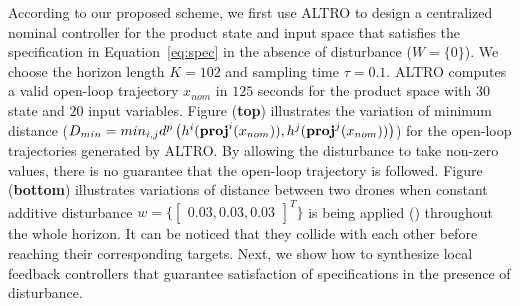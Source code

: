 According to our proposed scheme, we first use ALTRO to design a centralized nominal controller for the product state and input space that satisfies the specification in Equation~\eqref{eq:spec} in the absence of disturbance ($W=\{0\}$). We choose the horizon length $K=102$ and sampling time $\tau=0.1$. ALTRO computes a valid open-loop trajectory $x_{nom}$ in $125$ seconds for the product space with $30$ state and $20$ input variables. Figure  (\textbf{top}) illustrates the variation of minimum distance ($D_{min}=min_{i,j}d^{p}\left(h^i(\mathbf{proj}^i(x_{nom})),h^j(\mathbf{proj}^j(x_{nom}))\right)$) for the open-loop trajectories generated by ALTRO. By allowing the disturbance to take non-zero values, there is no guarantee that the open-loop trajectory is followed. Figure  (\textbf{bottom}) illustrates variations of distance between two drones when constant additive disturbance $w=\{\begin{bmatrix}0.03,0.03,0.03\end{bmatrix}^T\}$ is being applied () throughout the whole horizon. It can be noticed that they collide with each other before reaching their corresponding targets. Next, we show how to synthesize local feedback controllers that guarantee satisfaction of specifications in the presence of disturbance. %

